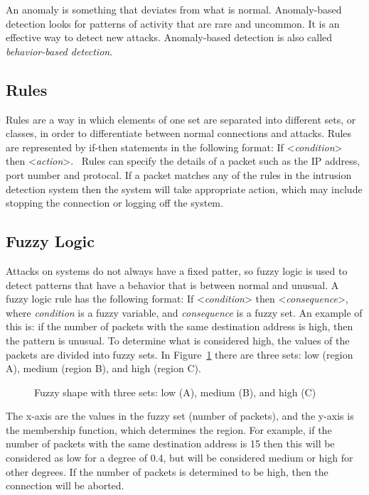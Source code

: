 \documentclass{sig-alternate}
\begin{document}
An anomaly is something that deviates from what is normal. Anomaly-based detection looks for patterns of activity that are rare and uncommon. It is an effective way to detect new attacks. Anomaly-based detection is also called \emph{behavior-based detection}.~\cite{DBLP:journals/corr/abs-1204-1336}




\subsection{Rules}
Rules are a way in which elements of one set are separated into different sets, or classes, in order to differentiate between normal connections and attacks. Rules are represented by if-then statements in the following format: If <\emph{condition}> then <\emph{action}>.~\cite{bapuji2012soft} Rules can specify the details of a packet such as the IP address, port number and protocal. If a packet matches any of the rules in the intrusion detection system then the system will take appropriate action, which may include stopping the connection or logging off the system.~\cite{DBLP:journals/corr/abs-1204-6416}




\subsection{Fuzzy Logic}
Attacks on systems do not always have a fixed patter, so fuzzy logic is used to detect patterns that have a behavior that is between normal and unusual. A fuzzy logic rule has the following format: If <\emph{condition}> then <\emph{consequence}>, where \emph{condition} is a fuzzy variable, and \emph{consequence} is a fuzzy set. An example of this is: if the number of packets with the same destination address is high, then the pattern is unusual. To determine what is considered high, the values of the packets are divided into fuzzy sets. In Figure~\ref{fig:triangleFigure} there are three sets: low (region A), medium (region B), and high (region C). 
\begin{figure}
\centering
{}
\caption{Fuzzy shape with three sets: low (A), medium (B), and high (C)~\cite{DBLP:journals/corr/abs-1204-6416}}
\label{fig:triangleFigure}
\end{figure}
The x-axis are the values in the fuzzy set (number of packets), and the y-axis is the membership function, which determines the region. For example, if the number of packets with the same destination address is 15 then this will be considered as low for a degree of 0.4, but will be considered medium or high for other degrees. If the number of packets is determined to be high, then the connection will be aborted.~\cite{DBLP:journals/corr/abs-1204-6416}
\end{document}
